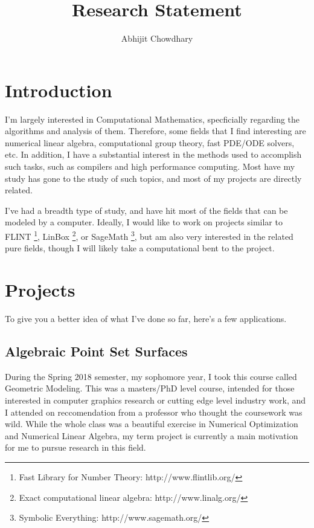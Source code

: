 \documentclass[12pt]{article}
\begin{document}
 

 
\title{Research Statement}%
\author{Abhijit Chowdhary\\ %
} %

\maketitle

\section{Introduction}

I'm largely interested in Computational Mathematics, specficially regarding the
algorithms and analysis of them. Therefore, some fields that I find interesting
are numerical linear algebra, computational group theory, fast PDE/ODE solvers,
etc. In addition, I have a substantial interest in the methods used to
accomplish such tasks, such as compilers and high performance computing. Most
have my study has gone to the study of such topics, and most of my projects are
directly related.

I've had a breadth type of study, and have hit most of the fields that can be
modeled by a computer. Ideally, I would like to work on projects similar to
FLINT \footnote{Fast Library for Number Theory: http://www.flintlib.org/},
LinBox \footnote{Exact computational linear algebra: http://www.linalg.org/}, or
SageMath \footnote{Symbolic Everything: http://www.sagemath.org/}, but am also
very interested in the related pure fields, though I will likely take a
computational bent to the project.

\section{Projects}

To give you a better idea of what I've done so far, here's a few applications.

\subsection{Algebraic Point Set Surfaces}

During the Spring 2018 semester, my sophomore year, I took this course called
Geometric Modeling. This was a masters/PhD level course, intended for those
interested in computer graphics research or cutting edge level industry work,
and I attended on reccomendation from a professor who thought the coursework was
wild. While the whole class was a beautiful exercise in Numerical Optimization
and Numerical Linear Algebra, my term project is currently a main motivation for
me to pursue research in this field.
\end{document}

